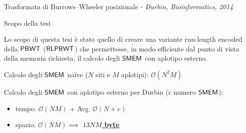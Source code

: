 \documentclass[]{beamer}
\def\PBWT{\mbox{\rm {\sf PBWT}}}
\def\RLPBWT{\mbox{\rm {\sf RLPBWT}}}
\def\SMEM{\mbox{\rm {\sf SMEM}}}
\begin{document}
\begin{frame}{{\small{Trasformata di Burrows--Wheeler posizionale -}} {\scriptsize{\textit{Durbin, Bioinformatics,
               2014}}}}
{\begin{figure}[H]
    \end{figure}
  }
\end{frame}
\begin{frame}{Scopo della tesi}
   \begin{alertblock}{}
    Lo scopo di questa tesi è stato quello di creare
    una variante run-length encoded della $\PBWT$ ($\RLPBWT$) che permettesse,
    in modo efficiente dal 
    punto di vista della memoria richiesta, il calcolo degli $\SMEM$ con
    aplotipo esterno. 
  \end{alertblock}
  \begin{block}{}
    Calcolo degli $\SMEM$ na\"{i}ve ($N$ siti e $M$
    aplotipi):
    $\mathcal{O}(N^2M)$
  \end{block}
  \begin{block}{}
    Calcolo degli $\SMEM$ con aplotipo esterno per Durbin ($c$ numero $\SMEM$):
    \begin{itemize}
      \item tempo: $\mathcal{O}(\mathit{NM})$ + Avg. $\mathcal{O}(N+c)$
      \item spazio: $\mathcal{O}(\mathit{NM})\implies$
      \underline{\textbf{$13\mathit{NM}$ byte}}
    \end{itemize}
  \end{block}
 
\end{frame}
\end{document}
